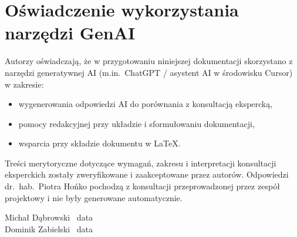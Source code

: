 \section{Oświadczenie wykorzystania narzędzi GenAI}

Autorzy oświadczają, że w przygotowaniu niniejszej dokumentacji skorzystano z narzędzi generatywnej AI (m.in.\ ChatGPT / asystent AI w środowisku Cursor) w zakresie:

\begin{itemize}
	\item wygenerowania odpowiedzi AI do porównania z konsultacją ekspercką,
	\item pomocy redakcyjnej przy układzie i sformułowaniu dokumentacji,
	\item wsparcia przy składzie dokumentu w \LaTeX.
\end{itemize}

Treści merytoryczne dotyczące wymagań, zakresu i interpretacji konsultacji eksperckich zostały zweryfikowane i zaakceptowane przez autorów. Odpowiedzi dr.\ hab.\ Piotra Hońko pochodzą z konsultacji przeprowadzonej przez zespół projektowy i nie były generowane automatycznie.

\vspace{1.5cm}
\begin{flushleft}
Michał Dąbrowski \dotfill\ data \dotfill \\[1.2cm]
Dominik Zabielski \dotfill\ data \dotfill
\end{flushleft}
